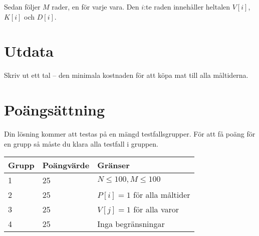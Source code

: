 Sedan följer $M$ rader, en för varje vara.
Den $i$:te raden innehåller heltalen $V[i]$, $K[i]$ och $D[i]$.

\section*{Utdata}
Skriv ut ett tal -- den minimala kostnaden för att köpa mat till alla måltiderna.

\section*{Poängsättning}
Din lösning kommer att testas på en mängd testfallsgrupper. För att få poäng för en grupp
så måste du klara alla testfall i gruppen.

\noindent
\begin{tabular}{| l | l | l |}
\hline
  Grupp & Poängvärde & Gränser \\ \hline
  1     & 25         & $N \le 100, M \le 100$ \\ \hline
  2     & 25         & $P[i] = 1$ för alla måltider \\ \hline
  3     & 25         & $V[j] = 1$ för alla varor \\ \hline
  4     & 25         & Inga begränsningar \\ \hline
\end{tabular}
